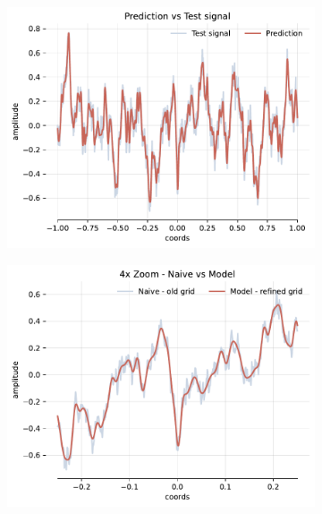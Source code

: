 \begin{figure}[h]
    \centering
    \begin{subfigure}[b]{0.32\textwidth}
        \centering
        \includegraphics[width=\textwidth]{img/ch3/pred-noise-1hl-32hf-w8.pdf}
        \caption{}
        \label{fig:pred-noise-1hl-32hf-w8}
    \end{subfigure}
    \begin{subfigure}[b]{0.32\textwidth}
        \centering
        \includegraphics[width=\textwidth]{img/ch3/4x-zoom-noise-1hl-32hf-w8.pdf}
        \caption{}
        \label{fig:4x-zoom-noise-1hl-32hf-w8}
    \end{subfigure}

\end{figure}
